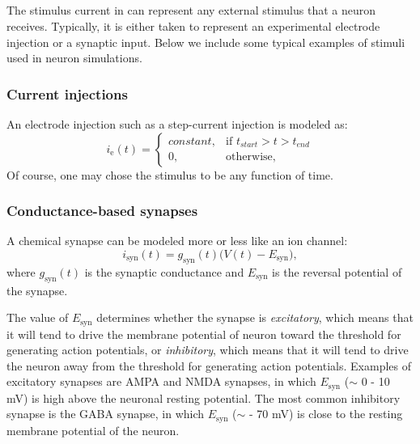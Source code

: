 \subsection{}
\label{sec:Neuron:stim}
The stimulus current in  can represent any external stimulus that a neuron receives. Typically, it is either taken to represent an experimental electrode injection or a synaptic input. Below we include some typical examples of stimuli used in neuron simulations. 

\subsubsection{Current injections}
An electrode injection such as a step-current injection is modeled as:
\begin{equation}
i_\text{e}(t)= 
\begin{cases}
    constant, & \text{if } t_{start} > t > t_{end} \\
    0,              & \text{otherwise},
\end{cases}
\label{eq:Neuron:injected}
\end{equation}
Of course, one may chose the stimulus to be any function of time.


\subsubsection{Conductance-based synapses}
\label{sec:Ch-Neuron:conductance-based-synapses}
A chemical synapse can be modeled more or less like an ion channel:
\begin{equation}
i_\text{syn}(t) = {g}_\text{syn}(t) \big(V(t)-E_\text{syn} \big), 
\label{eq:Neuron:chemicalsynapse}
\end{equation}
where $g_\text{syn}(t)$ is the synaptic conductance and $E_\text{syn}$ is the reversal potential of the synapse. 

The value of $E_\text{syn}$ determines whether the synapse is \textit{excitatory}, which means that it will tend to drive the  membrane potential of neuron toward the threshold for generating action potentials, or \textit{inhibitory}, which means that it will tend to drive the neuron away from the threshold for generating action potentials. Examples of excitatory synapses are AMPA and NMDA synapses, in which $E_\text{syn}$ ($\sim$ 0 - 10 mV) is high above the neuronal resting potential. The most common inhibitory synapse is the GABA synapse, in which $E_\text{syn}$ ($\sim$ - 70 mV) is close to the resting membrane potential of the neuron.

